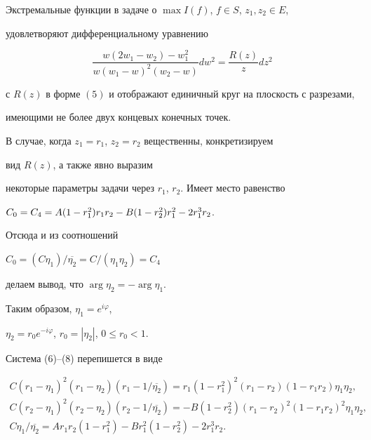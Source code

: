 \begin{thm}


Экстремальные функции в задаче о $\max I(f)$, $f\in S$, $z_1,z_2 \in E$,


удовлетворяют дифференциальному уравнению


\begin{equation}


\frac{w(2w_1-w_2)-w_1^2}{w(w_1-w)^2(w_2-w)}dw^2 =


\frac{R(z)}{z}dz^2


\end{equation}


с $R(z)$ в форме $(5)$ и отображают единичный круг на плоскость с разрезами,


имеющими не более двух концевых конечных точек.


\end{thm}





В случае, когда $z_1=r_1$, $z_2=r_2$ вещественны, конкретизируем


вид $R(z)$, а также явно выразим


некоторые параметры задачи через $r_1$, $r_2$. Имеет место равенство


$C_0=C_4=\linebreak A(1-r_1^2)r_1r_2-B(1-r_2^2)r_1^2-2r_1^3r_2$.


Отсюда и из соотношений


$C_0 =(C\eta_1)/\overline{\eta_2}= C/(\eta_1\eta_2)=C_4$


делаем вывод, что $\arg \eta_2 =-\arg \eta_1$.


Таким образом, $\eta_1 =e^{i\varphi}$,


$\eta_2 = r_0e^{-i\varphi}$, $r_0=|\eta_2|$, $0 \le r_0 < 1$.


Система (6)--(8) перепишется в виде


\begin{gather}


C(r_1-\eta_1)^2(r_1-\eta_2)(r_1- 1/\overline{\eta_2}) =


r_1(1-r_1^2)^2(r_1-r_2)(1-r_1r_2)\eta_1\eta_2, \\


%


C(r_2-\eta_1)^2(r_2-\eta_2)(r_2-1/\overline{\eta_2}) =


- B(1-r_2^2)(r_1-r_2)^2(1-r_1r_2)^2\eta_1\eta_2, \\


%


C\eta_1/\overline{\eta_2}=Ar_1r_2(1-r_1^2)-Br_1^2(1-r_2^2) -


2r_1^3r_2.


\end{gather}


